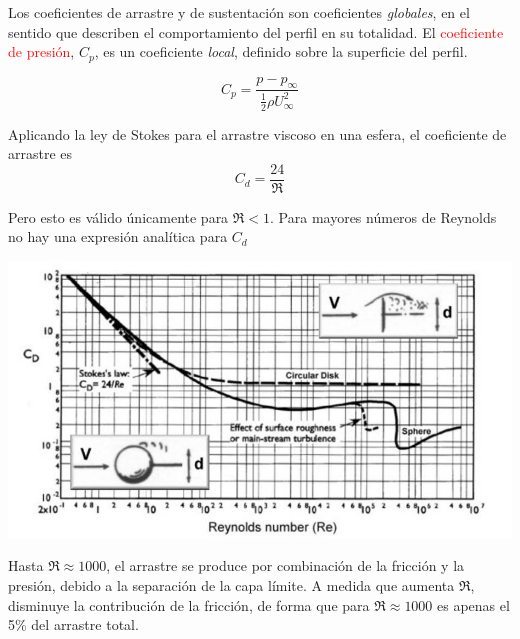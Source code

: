 	Los coeficientes de arrastre y de sustentación son coeficientes \textit{globales},
	en el sentido que describen el comportamiento del perfil en su totalidad.
	El \textcolor{red}{coeficiente de presión}, $C_{p}$, es un coeficiente
	\textit{local}, definido sobre la superficie del perfil. 
	
\begin{equation}
		C_{p}=\dfrac{p-p_{\infty}}{\frac{1}{2}\rho U_{\infty}^{2}}
\end{equation}
	
	

	
	Aplicando la ley de Stokes para el arrastre viscoso en una esfera,
	el coeficiente de arrastre es 
\begin{equation}
		C_{d}=\dfrac{24}{\Re}
\end{equation}
	
	Pero esto es válido únicamente para $\Re<1$. Para mayores números
	de Reynolds no hay una expresión analítica para $C_{d}$
	
	\begin{minipage}[c]{0.4\textwidth}%
\begin{center}
	\includegraphics[width=\linewidth]{TeX_files/chapter09-Externo/Cd_esphere}
\end{center}


	\end{minipage} %
	\begin{minipage}[c]{0.5\textwidth}%
		\smallskip{}
		
		Hasta $\Re\approx1000$, el arrastre se produce por combinación de
		la fricción y la presión, debido a la separación de la capa límite.
		A medida que aumenta $\Re$, disminuye la contribución de la fricción,
		de forma que para $\Re\approx1000$ es apenas el 5\% del arrastre
		total.%
	\end{minipage} 
	
